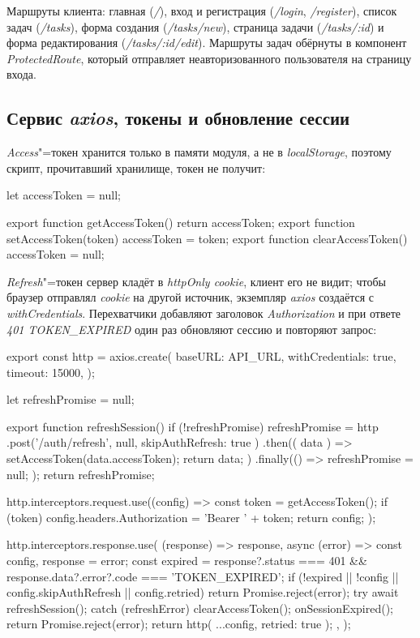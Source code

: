 \documentclass{stp}
\newcommand{\en}[1]{\textit{#1}}
\begin{document}
Маршруты клиента: главная (\en{/}), вход и регистрация (\en{/login},
\en{/register}), список задач (\en{/tasks}), форма создания
(\en{/tasks/new}), страница задачи (\en{/tasks/:id}) и форма редактирования
(\en{/tasks/:id/edit}). Маршруты задач обёрнуты в компонент
\en{ProtectedRoute}, который отправляет неавторизованного пользователя на
страницу входа.

\subsection{Сервис \en{axios}, токены и обновление сессии}

\en{Access}"=токен хранится только в памяти модуля, а не в
\en{localStorage}, поэтому скрипт, прочитавший хранилище, токен не получит:

\begin{stplisting}
let accessToken = null;

export function getAccessToken() { return accessToken; }
export function setAccessToken(token) { accessToken = token; }
export function clearAccessToken() { accessToken = null; }
\end{stplisting}

\en{Refresh}"=токен сервер кладёт в \en{httpOnly cookie}, клиент его не
видит; чтобы браузер отправлял \en{cookie} на другой источник, экземпляр
\en{axios} создаётся с \en{withCredentials}. Перехватчики добавляют заголовок
\en{Authorization} и при ответе \en{401 TOKEN\_EXPIRED} один раз обновляют
сессию и повторяют запрос:

\begin{stplisting}
export const http = axios.create({
  baseURL: API_URL,
  withCredentials: true,
  timeout: 15000,
});

let refreshPromise = null;

export function refreshSession() {
  if (!refreshPromise) {
    refreshPromise = http
      .post('/auth/refresh', null, { skipAuthRefresh: true })
      .then(({ data }) => {
        setAccessToken(data.accessToken);
        return data;
      })
      .finally(() => { refreshPromise = null; });
  }
  return refreshPromise;
}

http.interceptors.request.use((config) => {
  const token = getAccessToken();
  if (token) config.headers.Authorization = 'Bearer ' + token;
  return config;
});

http.interceptors.response.use(
  (response) => response,
  async (error) => {
    const { config, response } = error;
    const expired = response?.status === 401
      && response.data?.error?.code === 'TOKEN_EXPIRED';
    if (!expired || !config || config.skipAuthRefresh
        || config.retried) {
      return Promise.reject(error);
    }
    try {
      await refreshSession();
    } catch (refreshError) {
      clearAccessToken();
      onSessionExpired();
      return Promise.reject(error);
    }
    return http({ ...config, retried: true });
  },
);
\end{stplisting}
\end{document}
